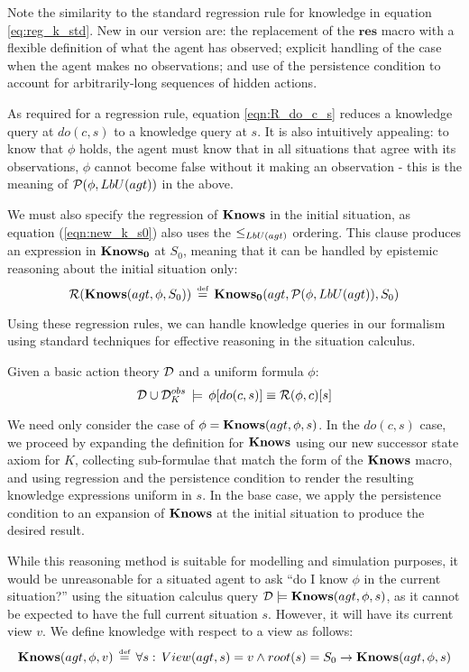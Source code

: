 Note the similarity to the standard regression rule for knowledge
in equation \eqref{eq:reg_k_std}. New in our version are: the replacement
of the $\mathbf{res}$ macro with a flexible definition of what the
agent has observed; explicit handling of the case when the agent makes
no observations; and use of the persistence condition to account for
arbitrarily-long sequences of hidden actions.

As required for a regression rule, equation \eqref{eqn:R_do_c_s}
reduces a knowledge query at $do(c,s)$ to a knowledge query at $s$.
It is also intuitively appealing: to know that $\phi$ holds, the
agent must know that in all situations that agree with its observations,
$\phi$ cannot become false without it making an observation - this
is the meaning of $\mathcal{P}(\phi,LbU(agt))$ in the above.

We must also specify the regression of $\mathbf{Knows}$ in the initial situation,
as equation (\ref{eqn:new_k_s0}) also uses the $\leq_{LbU(agt)}$
ordering. This clause produces an expression in $\mathbf{Knows_{0}}$ at $S_{0}$,
meaning that it can be handled by epistemic reasoning about the initial
situation only:\begin{equation}
\mathcal{R}(\mathbf{Knows}(agt,\phi,S_{0}))\,\stackrel{\mbox{\tiny def}}{=}\,\mathbf{Knows_{0}}(agt,\mathcal{P}(\phi,LbU(agt)),S_{0})\label{eqn:R_s0}\end{equation}


Using these regression rules, we can handle knowledge queries in our
formalism using standard techniques for effective reasoning in the
situation calculus.

\begin{thm}
\label{thm:Reg_Knows}Given a basic action theory $\mathcal{D}$ and a uniform
formula $\phi$:\[
\mathcal{D}\cup\mathcal{D}_{K}^{obs}\,\models\,\phi[do(c,s)]\equiv\mathcal{R}(\phi,c)[s]\]

\end{thm}
\begin{proofsketch}
We need only consider the case of $\phi=\mathbf{Knows}(agt,\phi,s)$. In the
$do(c,s)$ case, we proceed by expanding the definition for $\mathbf{Knows}$
using our new successor state axiom for $K$, collecting sub-formulae
that match the form of the $\mathbf{Knows}$ macro, and using regression and
the persistence condition to render the resulting knowledge expressions
uniform in $s$. In the base case, we apply the persistence condition
to an expansion of $\mathbf{Knows}$ at the initial situation to produce the
desired result. 
\end{proofsketch}
While this reasoning method is suitable for modelling and simulation
purposes, it would be unreasonable for a situated agent to ask {}``do
I know $\phi$ in the current situation?'' using the situation calculus
query $\mathcal{D}\models\mathbf{Knows}(agt,\phi,s)$, as it cannot be expected
to have the full current situation $s$. However, it will have its
current view $v$. We define knowledge with respect to a view as follows:\[
\mathbf{Knows}(agt,\phi,v)\,\stackrel{\mbox{\tiny def}}{=}\,\forall s:\, View(agt,s)=v\wedge root(s)=S_{0}\rightarrow\mathbf{Knows}(agt,\phi,s)\]


